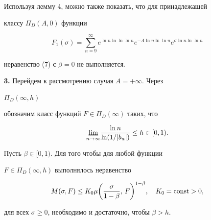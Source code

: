 \begin{pf}
 


Используя лемму 4, можно также показать, что для принадлежащей 


классу $\Pi_D(A,0)$ функции 


$$ 




F_1(\sigma)=\sum^\infty_{n=9} 


e^{\ln n\ln\ln\ln n} 


e^{-A\ln n\ln\ln n}e^{\sigma\ln n\ln \ln n} 


$$ 


неравенство (7) с $\beta=0$ не выполняется. 


\end{pf} 


 


{\bf 3.} Перейдем к рассмотрению случая $A=+\infty$. Через 


$\Pi_D(\infty,h)$ 


обозначим класс функций $F\in\Pi_D(\infty)$ таких, что 


$$ 


\underset{n\to\infty}{\varliminf} 


\frac{\ln n}{\ln(1/|b_n|)}\le h\in[0,1). 


$$ 


 


\begin{thm} Пусть $\beta\in[0,1)$. Для того чтобы для любой функции 


$F\in\Pi_D(\infty,h)$ выполнялось неравенство 


\begin{equation} 


M(\sigma,F)\le K_0\mu\biggl(\frac{\sigma}{1-\beta},\,F 


\biggr)^{1-\beta},\quad K_0=\const >0,


\end{equation} 


для всех $\sigma\ge 0$, необходимо и достаточно, чтобы $\beta>h$. 


\end{thm} 


 


